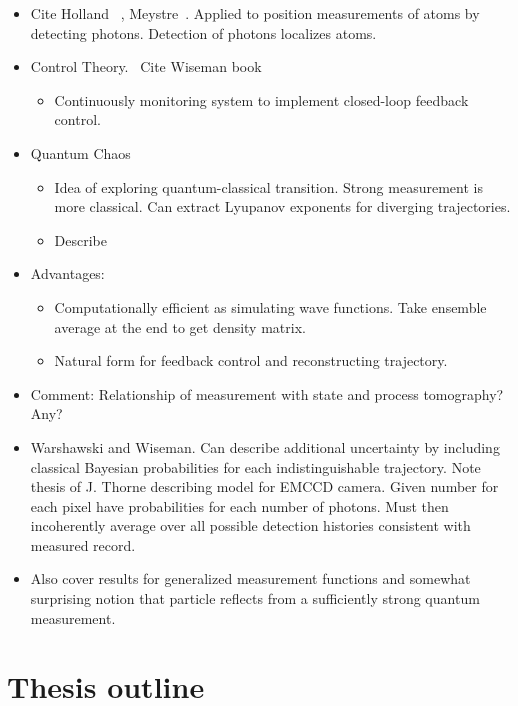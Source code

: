 \begin{itemize}
\begin{itemize}
\item Cite Holland ~\cite{Holland1996}, Meystre~\cite{Greenwood1997}.
  Applied to position measurements of atoms by detecting photons.
  Detection of photons localizes atoms.  
\item Control Theory.~\cite{Wiseman1993}  Cite Wiseman book
\begin{itemize}
  \item Continuously monitoring system to implement closed-loop feedback control.  
\end{itemize}
\item Quantum Chaos
\begin{itemize}
  \item Idea of exploring quantum-classical transition.
  Strong measurement is more classical.
  Can extract Lyupanov exponents for diverging trajectories.
  \cite{Bhattacharya2000,Habib2002,Habib2006}
  \cite{Scott2001}
  \item Describe 
\end{itemize}
\item Advantages:
\begin{itemize}
  \item Computationally efficient as simulating wave functions.
  Take ensemble average at the end to get density matrix.  
  \item Natural form for feedback control and reconstructing trajectory.  
\end{itemize}
\item Comment: Relationship of measurement with state and process tomography?  Any?  

\item Warshawski and Wiseman.
  Can describe additional uncertainty by including classical Bayesian probabilities for each indistinguishable trajectory.
  Note thesis of J. Thorne describing model for EMCCD camera.
  Given number for each pixel have probabilities for each number of photons.
  Must then incoherently average over all possible detection histories consistent with measured record.
  \cite{Warszawski2002,Warszawski2003a,Warszawski2003b}
\item Also cover results for generalized measurement functions and 
somewhat surprising notion that particle reflects from a sufficiently
strong quantum measurement.
\end{itemize}

\section{Thesis outline}


\end{itemize}
